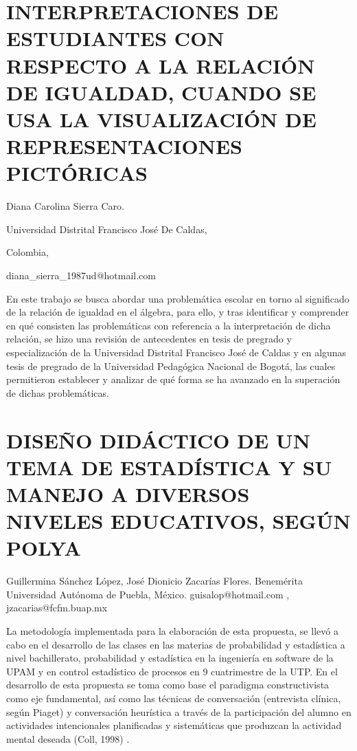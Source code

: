 \section{INTERPRETACIONES DE ESTUDIANTES CON RESPECTO A LA RELACIÓN DE IGUALDAD,
CUANDO SE USA LA VISUALIZACIÓN DE REPRESENTACIONES PICTÓRICAS }

\begin{datos}

Diana Carolina Sierra Caro.

Universidad Distrital Francisco José De Caldas,

Colombia,

diana\_sierra\_1987ud@hotmail.com

\end{datos}

En este trabajo se busca abordar una problemática escolar en torno
al significado de la relación de igualdad en el álgebra, para ello,
y tras identificar y comprender en qué consisten las problemáticas
con referencia a la interpretación de dicha relación, se hizo una
revisión de antecedentes en tesis de pregrado y especialización de
la Universidad Distrital Francisco José de Caldas y en algunas tesis
de pregrado de la Universidad Pedagógica Nacional de Bogotá, las cuales
permitieron establecer y analizar de qué forma se ha avanzado en la
superación de dichas problemáticas. 


\section{DISEÑO DIDÁCTICO DE UN TEMA DE ESTADÍSTICA Y SU MANEJO A DIVERSOS
NIVELES EDUCATIVOS, SEGÚN POLYA }

\begin{datos}

Guillermina Sánchez López, José Dionicio Zacarías Flores. Benemérita
Universidad Autónoma de Puebla, México. guisalop@hotmail.com , jzacarias@fcfm.buap.mx 

\end{datos}

La metodología implementada para la elaboración de esta propuesta,
se llevó a cabo en el desarrollo de las clases en las materias de
probabilidad y estadística a nivel bachillerato, probabilidad y estadística
en la ingeniería en software de la UPAM y en control estadístico de
procesos en 9\textdegree{} cuatrimestre de la UTP. En el desarrollo
de esta propuesta se toma como base el paradigma constructivista como
eje fundamental, así como las técnicas de conversación (entrevista
clínica, según Piaget) y conversación heurística a través de la participación
del alumno en actividades intencionales planificadas y sistemáticas
que produzcan la actividad mental deseada (Coll, 1998) .


